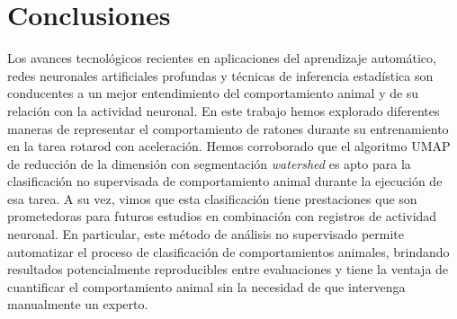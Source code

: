\chapter*{Conclusiones}\label{cha:conclusiones}



\clearpage

Los avances tecnológicos recientes en aplicaciones del aprendizaje automático, redes neuronales artificiales profundas y técnicas de inferencia estadística son conducentes a un mejor entendimiento del comportamiento animal y de su relación con la actividad neuronal. En este trabajo hemos explorado diferentes maneras de representar el comportamiento de ratones durante su entrenamiento en la tarea rotarod con aceleración. Hemos corroborado que el algoritmo UMAP de reducción de la dimensión con segmentación \textit{watershed} es apto para la clasificación no supervisada de comportamiento animal durante la ejecución de esa tarea. A su vez, vimos que esta clasificación tiene prestaciones que son prometedoras para futuros estudios en combinación con registros de actividad neuronal. En particular, este método de análisis no supervisado permite automatizar el proceso de clasificación de comportamientos animales, brindando resultados potencialmente reproducibles entre evaluaciones y tiene la ventaja de cuantificar el comportamiento animal sin la necesidad de que intervenga manualmente un experto.

